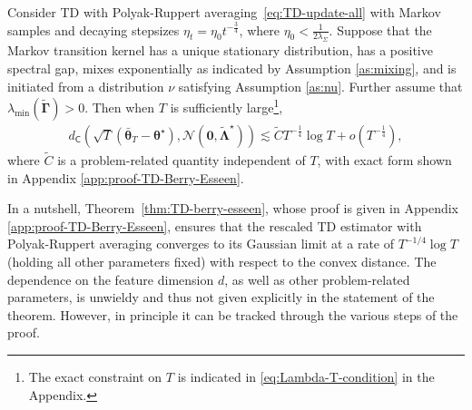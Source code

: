 \medskip
\begin{customtheorem}\label{thm:TD-berry-esseen}
Consider TD with Polyak-Ruppert averaging~\eqref{eq:TD-update-all} with Markov samples and decaying stepsizes $\eta_t = \eta_0 t^{-\frac{3}{4}}$, where $\eta_0 < \frac{1}{2\lambda_{\Sigma}}$. Suppose that the Markov transition kernel has a unique stationary distribution, has a positive spectral gap, mixes exponentially as indicated by Assumption \ref{as:mixing}, and is initiated from a distribution $\nu$ satisfying Assumption \ref{as:nu}. Further assume that $\lambda_{\min}(\tilde{\bm{\Gamma}}) > 0$. Then when $T$ is sufficiently large\footnote{The exact constraint on $T$ is indicated in \eqref{eq:Lambda-T-condition} in the Appendix.}, 
\begin{align*}
d_{\mathsf{C}}(\sqrt{T}(\bar{\bm{\theta}}_T-\bm{\theta}^\star),\mathcal{N}(\bm{0},\tilde{\bm{\Lambda}}^\star)) \lesssim \tilde{C}T^{-\frac{1}{4}}\log T + o(T^{-\frac{1}{4}}),
\end{align*}
where $\widetilde{C}$ is a problem-related quantity independent of $T$, with exact form shown in Appendix \ref{app:proof-TD-Berry-Esseen}.
\end{customtheorem}
\medskip




In a nutshell, Theorem~\ref{thm:TD-berry-esseen}, whose proof is given in Appendix \ref{app:proof-TD-Berry-Esseen}, ensures that the rescaled TD estimator with Polyak-Ruppert averaging converges to its Gaussian limit at a rate of $T^{-1/4}\log T$ (holding all other parameters fixed) with respect to the convex distance. 
The dependence on the feature dimension $d$, as well as other problem-related parameters, is unwieldy and thus not given explicitly in the statement of the theorem. However, in principle it can be tracked through the various steps of the proof.

